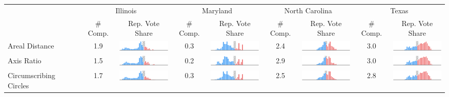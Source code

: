 
\begin{table}
\renewcommand{\arraystretch}{1.3}
 \begin{tabular}{lcccccccc}
\hline \hline
{} & \multicolumn{2}{c}{Illinois} & \multicolumn{2}{c}{Maryland} & \multicolumn{2}{c}{North Carolina} & \multicolumn{2}{c}{Texas} \\
{} & \# \fontsize{8.5}{12}\selectfont Comp. &               \fontsize{8.5}{12}\selectfont Rep. Vote Share & \# \fontsize{8.5}{12}\selectfont Comp. &               \fontsize{8.5}{12}\selectfont Rep. Vote Share & \# \fontsize{8.5}{12}\selectfont Comp. &               \fontsize{8.5}{12}\selectfont Rep. Vote Share & \# \fontsize{8.5}{12}\selectfont Comp. &               \fontsize{8.5}{12}\selectfont Rep. Vote Share \\
\hline
Areal Distance         &     1.9 &       \includegraphics[width=7em]{comp_hist/il_dist_a} &     0.3 &       \includegraphics[width=7em]{comp_hist/md_dist_a} &     2.4 &       \includegraphics[width=7em]{comp_hist/nc_dist_a} &     3.0 &       \includegraphics[width=7em]{comp_hist/tx_dist_a} \\
Axis Ratio             &     1.5 &   \includegraphics[width=7em]{comp_hist/il_axis_ratio} &     0.2 &   \includegraphics[width=7em]{comp_hist/md_axis_ratio} &     2.9 &   \includegraphics[width=7em]{comp_hist/nc_axis_ratio} &     3.0 &   \includegraphics[width=7em]{comp_hist/tx_axis_ratio} \\
Circumscribing Circles &     1.7 &        \includegraphics[width=7em]{comp_hist/il_reock} &     0.3 &        \includegraphics[width=7em]{comp_hist/md_reock} &     2.5 &        \includegraphics[width=7em]{comp_hist/nc_reock} &     2.8 &        \includegraphics[width=7em]{comp_hist/tx_reock} \\

\end{tabular}
\end{table}
